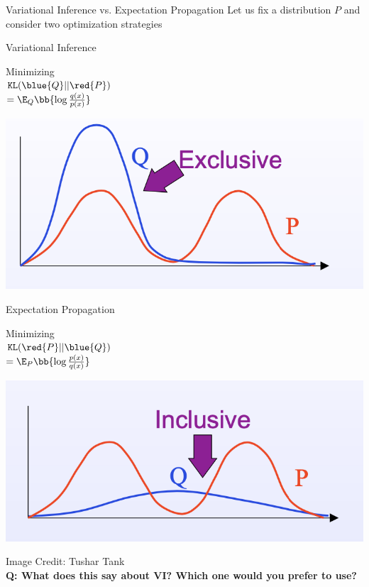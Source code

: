 \documentclass[10pt]{beamer}
\begin{document}
\begin{frame}{Variational Inference vs. Expectation Propagation}
\footnotesize
Let us fix a distribution $P$ and consider two optimization strategies
\begin{block}{Variational Inference}
\begin{minipage}{.3\textwidth}
Minimizing \\
$\texttt{KL}(\blue{Q} || \red{P})$ \\
\tiny $ = \E_Q \bb{\log \frac{q(x)}{p(x)}}$
\end{minipage}
\hfill
\begin{minipage}{.6\textwidth}
\includegraphics[width=.9\textwidth]{images/kl_for_vi}
\end{minipage}
\end{block}

\begin{block}{Expectation Propagation}
\begin{minipage}{.3\textwidth}
Minimizing \\
$\texttt{KL}(\red{P} || \blue{Q})$ \\
\tiny $ = \E_P \bb{\log \frac{p(x)}{q(x)}}$
\end{minipage}
\hfill
\begin{minipage}{.6\textwidth}
\includegraphics[width=.9\textwidth]{images/kl_for_ep}
\end{minipage}
\end{block}
\hfill \tiny Image Credit: Tushar Tank \\
\vfill \tiny \bf{Q:}  What does this say about VI?  Which one would you prefer to use?    
\end{frame}
\end{document}
